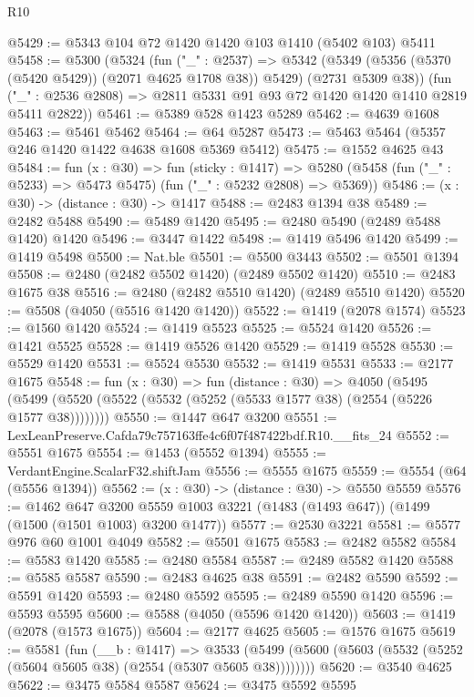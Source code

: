 \begin{lexlean}{R10}
\begin{coremodule}
@5429 := @5343 @104 @72 @1420 @1420 @103 @1410 (@5402 @103) @5411
@5458 := @5300
    (@5324
      (fun ("_" : @2537) =>
      @5342 (@5349 (@5356 (@5370 (@5420 @5429)) (@2071 @4625 @1708 @38)) @5429) (@2731 @5309 @38))
      (fun ("_" : @2536 @2808) => @2811 @5331 @91 @93 @72 @1420 @1420 @1410 @2819 @5411 @2822))
@5461 := @5389 @528 @1423 @5289
@5462 := @4639 @1608
@5463 := @5461 @5462
@5464 := @64 @5287
@5473 := @5463 @5464 (@5357 @246 @1420 @1422 @4638 @1608 @5369 @5412)
@5475 := @1552 @4625 @43
@5484 := fun (x : @30) =>
  fun (sticky : @1417) =>
  @5280 (@5458 (fun ("_" : @5233) => @5473 @5475) (fun ("_" : @5232 @2808) => @5369))
@5486 := (x : @30) -> (distance : @30) -> @1417
@5488 := @2483 @1394 @38
@5489 := @2482 @5488
@5490 := @5489 @1420
@5495 := @2480 @5490 (@2489 @5488 @1420) @1420
@5496 := @3447 @1422
@5498 := @1419 @5496 @1420
@5499 := @1419 @5498
@5500 := Nat.ble
@5501 := @5500 @3443
@5502 := @5501 @1394
@5508 := @2480 (@2482 @5502 @1420) (@2489 @5502 @1420)
@5510 := @2483 @1675 @38
@5516 := @2480 (@2482 @5510 @1420) (@2489 @5510 @1420)
@5520 := @5508 (@4050 (@5516 @1420 @1420))
@5522 := @1419 (@2078 @1574)
@5523 := @1560 @1420
@5524 := @1419 @5523
@5525 := @5524 @1420
@5526 := @1421 @5525
@5528 := @1419 @5526 @1420
@5529 := @1419 @5528
@5530 := @5529 @1420
@5531 := @5524 @5530
@5532 := @1419 @5531
@5533 := @2177 @1675
@5548 := fun (x : @30) =>
  fun (distance : @30) =>
  @4050 (@5495 (@5499 (@5520 (@5522 (@5532 (@5252 (@5533 @1577 @38) (@2554 (@5226 @1577 @38))))))))
@5550 := @1447 @647 @3200
@5551 := LexLeanPreserve.Cafda79c757163ffe4c6f07f487422bdf.R10.__fits_24
@5552 := @5551 @1675
@5554 := @1453 (@5552 @1394)
@5555 := VerdantEngine.ScalarF32.shiftJam
@5556 := @5555 @1675
@5559 := @5554 (@64 (@5556 @1394))
@5562 := (x : @30) -> (distance : @30) -> @5550 @5559
@5576 := @1462
    @647
    @3200
    @5559
    @1003
    @3221
    (@1483 (@1493 @647))
    (@1499 (@1500 (@1501 @1003) @3200 @1477))
@5577 := @2530 @3221
@5581 := @5577 @976 @60 @1001 @4049
@5582 := @5501 @1675
@5583 := @2482 @5582
@5584 := @5583 @1420
@5585 := @2480 @5584
@5587 := @2489 @5582 @1420
@5588 := @5585 @5587
@5590 := @2483 @4625 @38
@5591 := @2482 @5590
@5592 := @5591 @1420
@5593 := @2480 @5592
@5595 := @2489 @5590 @1420
@5596 := @5593 @5595
@5600 := @5588 (@4050 (@5596 @1420 @1420))
@5603 := @1419 (@2078 (@1573 @1675))
@5604 := @2177 @4625
@5605 := @1576 @1675
@5619 := @5581
    (fun (__b : @1417) =>
    @3533 (@5499 (@5600 (@5603 (@5532 (@5252 (@5604 @5605 @38) (@2554 (@5307 @5605 @38))))))))
@5620 := @3540 @4625
@5622 := @3475 @5584 @5587
@5624 := @3475 @5592 @5595

\end{coremodule}
\end{lexlean}
